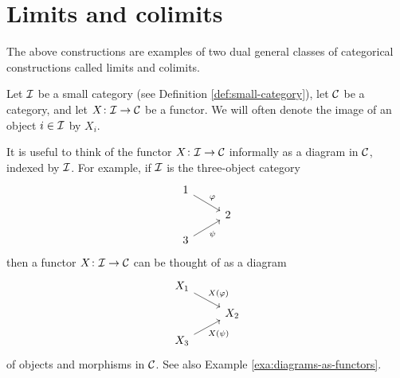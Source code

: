 %
%
%
%
\section{Limits and colimits}

The above constructions are examples of two dual general classes of categorical constructions called limits and colimits.

Let ${\mathcal{I}}$ be a small category (see Definition \ref{def:small-category}), let ${\mathcal{C}}$ be a category, and let $X\colon {\mathcal{I}} \to {\mathcal{C}}$ be a functor. We will often denote the image of an object $i \in {\mathcal{I}}$ by $X_i$.

It is useful to think of the functor $X\colon {\mathcal{I}}\to {\mathcal{C}}$ informally as a diagram in ${\mathcal{C}}$, indexed by ${\mathcal{I}}$. For example, if ${\mathcal{I}}$ is the three-object category
\[
\begin{tikzcd}[row sep=small]
1 \arrow{rd}{\varphi}  \\ & 2 \\ 3 \arrow[swap]{ru}{\psi}
\end{tikzcd}
\]
then a functor $X\colon {\mathcal{I}}\to {\mathcal{C}}$ can be thought of as  a diagram
\[
\begin{tikzcd}[row sep=small]
X_1 \arrow{rd}{\!X(\varphi)}  \\ & X_2 \\ X_3 \arrow[swap]{ru}{\!X(\psi)}
\end{tikzcd}
\]
of objects and morphisms in ${\mathcal{C}}$. See also Example \ref{exa:diagrams-as-functors}.

